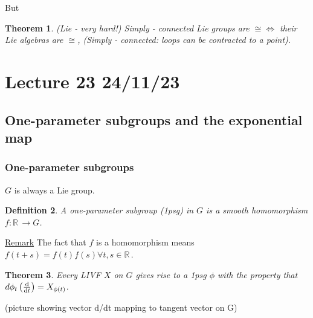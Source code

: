 \documentclass[12pt,a4paper]{article}
\newcommand{\rR}{\ensuremath{\mathbb{R}\,}}
\newcommand{\dgq}[2]{\ensuremath{d {#1}_{#2}}}
\newcommand{\ul}[1]{\underline{#1}}
\newtheorem{thm}{Theorem}[subsubsection]
\newtheorem{defn}[thm]{Definition}
\begin{document}
But

\begin{thm}
(Lie - very hard!) Simply - connected Lie groups are $\cong \iff$ their Lie algebras are $\cong$, (Simply - connected: loops can be contracted to a point).
\end{thm}

\section{Lecture 23 24/11/23}
\subsection{One-parameter subgroups and the exponential map}
\subsubsection{One-parameter subgroups}
$G$ is always a Lie group.

\begin{defn}
A one-parameter subgroup (1psg) in $G$ is a smooth homomorphism $f:\rR\to G$.
\end{defn}

\ul{Remark} The fact that $f$ is a homomorphism means $f(t+s)=f(t)f(s) \forall t,s \in \rR$.

\begin{thm}
Every LIVF $X$ on $G$ gives rise to a 1psg $\phi$ with the property that $\dgq{\phi}{t}\left(\dv{t}\right)=X_{\phi(t)}$.
\end{thm}
(picture showing vector d/dt mapping to tangent vector on G)
\end{document}
